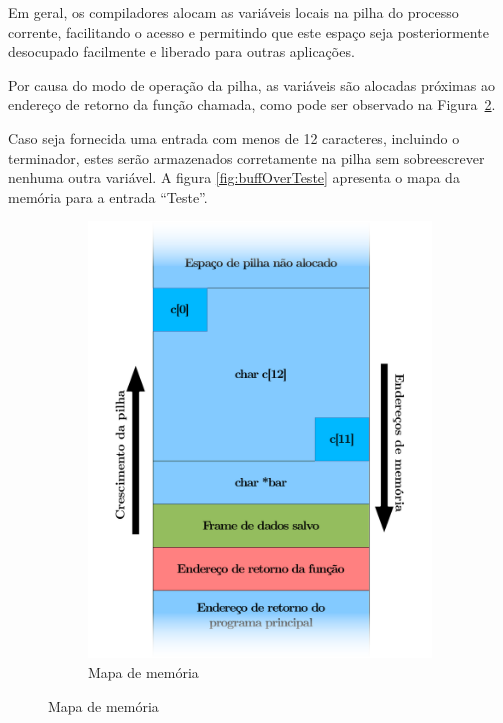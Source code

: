 \documentclass[12pt,openright,oneside,a4paper,brazil]{abntex2}
\begin{document}
Em geral, os compiladores alocam as variáveis locais na pilha do processo corrente, facilitando o acesso e permitindo que este espaço seja posteriormente desocupado facilmente e liberado para outras aplicações.

Por causa do modo de operação da pilha, as variáveis são alocadas próximas ao endereço de retorno da função chamada, como pode ser observado na Figura~\ref{fig:buffOverAntes}.

Caso seja fornecida uma entrada com menos de 12 caracteres, incluindo o terminador, estes serão armazenados corretamente na pilha sem sobreescrever nenhuma outra variável. A figura \ref{fig:buffOverTeste} apresenta o mapa da memória para a entrada ``Teste''.

\begin{figure}[ht]
        \center
        \begin{subfigure}[b]{0.4\textwidth}
        	\includegraphics[width=\textwidth]{img/bufferOverAntes.pdf}
        	\caption{Mapa de memória}
        	\label{fig:buffOverAntes}
        \end{subfigure}

\end{figure}
\end{document}
